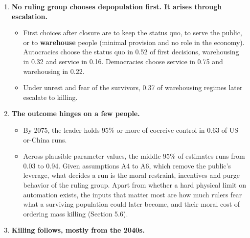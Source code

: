 \documentclass[
  10pt,
]{article}
\providecommand{\tightlist}{%
  \setlength{\itemsep}{0pt}\setlength{\parskip}{0pt}}
\begin{document}
\begin{enumerate}
  \begin{itemize}
  \tightlist
  \item
    The US or China public loses its rights in 0.80 of runs by 2075, mostly in the first five years
    after closure: 0.29 by 2035 and 0.68 by 2040 (median year 2036, two years after the median
    closure). In 2075 it is still stripped of rights in 0.74, and disempowered, counting plain
    autocracy, in 0.94 (Appendix E; results/v7\_rights\_timeline.json).
  \item
    Prolonged disempowerment is a catastrophe in its own right, not only a step toward mass killing.
  \end{itemize}
\item
  \textbf{No ruling group chooses depopulation first. It arises through escalation.}

  \begin{itemize}
  \tightlist
  \item
    First choices after closure are to keep the status quo, to serve the public, or to
    \textbf{warehouse} people (minimal provision and no role in the economy). Autocracies choose the
    status quo in 0.52 of first decisions, warehousing in 0.32 and service in 0.16. Democracies
    choose service in 0.75 and warehousing in 0.22.
  \item
    Under unrest and fear of the survivors, 0.37 of warehousing regimes later escalate to killing.
  \end{itemize}
\item
  \textbf{The outcome hinges on a few people.}

  \begin{itemize}
  \tightlist
  \item
    By 2075, the leader holds 95\% or more of coercive control in 0.63 of US-or-China runs.
  \item
    Across plausible parameter values, the middle 95\% of estimates runs from 0.03 to 0.94. Given
    assumptions A4 to A6, which remove the public's leverage, what decides a run is the moral
    restraint, incentives and purge behavior of the ruling group. Apart from whether a hard physical
    limit on automation exists, the inputs that matter most are how much rulers fear what a
    surviving population could later become, and their moral cost of ordering mass killing (Section
    5.6).
  \end{itemize}
\item
  \textbf{Killing follows, mostly from the 2040s.}


\end{enumerate}
\end{document}
